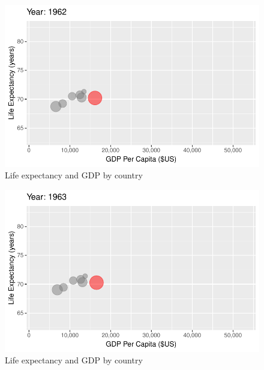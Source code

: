 \documentclass[
  letterpaper,
  DIV=11,
  numbers=noendperiod]{scrreport}
\theoremstyle{definition}
\theoremstyle{remark}
\begin{document}
\begin{figure}

{\centering \includegraphics{index_files/figure-pdf/fig-anim-country-19.pdf}

}

\caption{\label{fig-anim-country-19}Life expectancy and GDP by country}

\end{figure}

\begin{figure}

{\centering \includegraphics{index_files/figure-pdf/fig-anim-country-20.pdf}

}

\caption{\label{fig-anim-country-20}Life expectancy and GDP by country}

\end{figure}
\end{document}
